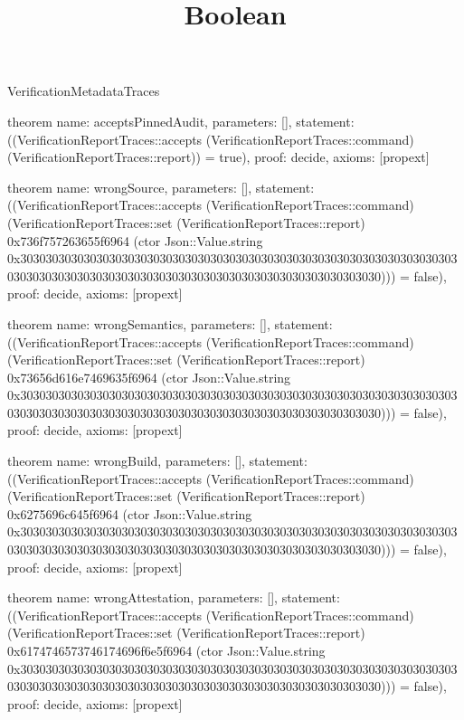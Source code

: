 \begin{lexlean}{VerificationMetadataTraces}
\title{Boolean}
\begin{semanticmodule}

theorem{
  name: acceptsPinnedAudit,
  parameters: [],
  statement: ((VerificationReportTraces::accepts (VerificationReportTraces::command) (VerificationReportTraces::report)) = true),
  proof: decide{},
  axioms: [propext]
}

theorem{
  name: wrongSource,
  parameters: [],
  statement: ((VerificationReportTraces::accepts (VerificationReportTraces::command) (VerificationReportTraces::set (VerificationReportTraces::report) 0x736f757263655f6964 (ctor Json::Value.string 0x30303030303030303030303030303030303030303030303030303030303030303030303030303030303030303030303030303030303030303030303030303030))) = false),
  proof: decide{},
  axioms: [propext]
}

theorem{
  name: wrongSemantics,
  parameters: [],
  statement: ((VerificationReportTraces::accepts (VerificationReportTraces::command) (VerificationReportTraces::set (VerificationReportTraces::report) 0x73656d616e7469635f6964 (ctor Json::Value.string 0x30303030303030303030303030303030303030303030303030303030303030303030303030303030303030303030303030303030303030303030303030303030))) = false),
  proof: decide{},
  axioms: [propext]
}

theorem{
  name: wrongBuild,
  parameters: [],
  statement: ((VerificationReportTraces::accepts (VerificationReportTraces::command) (VerificationReportTraces::set (VerificationReportTraces::report) 0x6275696c645f6964 (ctor Json::Value.string 0x30303030303030303030303030303030303030303030303030303030303030303030303030303030303030303030303030303030303030303030303030303030))) = false),
  proof: decide{},
  axioms: [propext]
}

theorem{
  name: wrongAttestation,
  parameters: [],
  statement: ((VerificationReportTraces::accepts (VerificationReportTraces::command) (VerificationReportTraces::set (VerificationReportTraces::report) 0x6174746573746174696f6e5f6964 (ctor Json::Value.string 0x30303030303030303030303030303030303030303030303030303030303030303030303030303030303030303030303030303030303030303030303030303030))) = false),
  proof: decide{},
  axioms: [propext]
}


\end{semanticmodule}
\end{lexlean}

